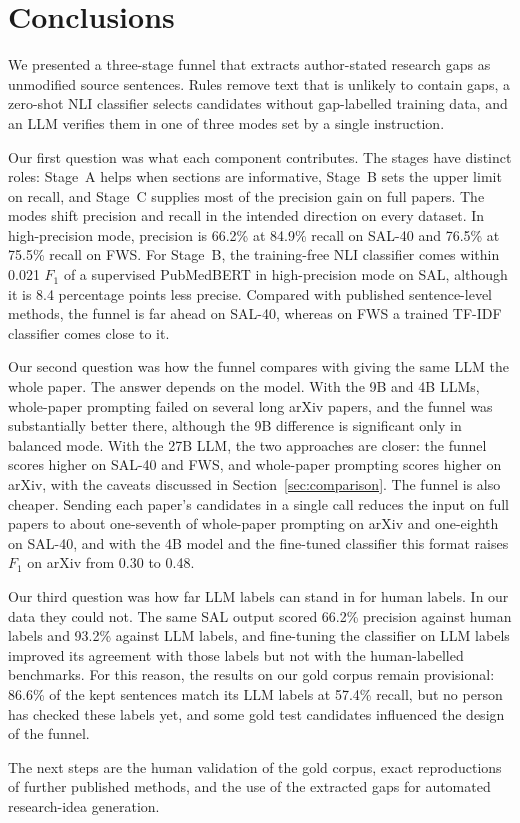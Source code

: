 \section{Conclusions}
\label{sec:conclusions}

We presented a three-stage funnel that extracts author-stated research gaps as unmodified source sentences. Rules remove text that is unlikely to contain gaps, a zero-shot NLI classifier selects candidates without gap-labelled training data, and an LLM verifies them in one of three modes set by a single instruction.

Our first question was what each component contributes. The stages have distinct roles: Stage~A helps when sections are informative, Stage~B sets the upper limit on recall, and Stage~C supplies most of the precision gain on full papers. The modes shift precision and recall in the intended direction on every dataset. In high-precision mode, precision is 66.2\% at 84.9\% recall on SAL-40 and 76.5\% at 75.5\% recall on FWS. For Stage~B, the training-free NLI classifier comes within 0.021 $F_1$ of a supervised PubMedBERT in high-precision mode on SAL, although it is 8.4 percentage points less precise. Compared with published sentence-level methods, the funnel is far ahead on SAL-40, whereas on FWS a trained TF-IDF classifier comes close to it.

Our second question was how the funnel compares with giving the same LLM the whole paper. The answer depends on the model. With the 9B and 4B LLMs, whole-paper prompting failed on several long arXiv papers, and the funnel was substantially better there, although the 9B difference is significant only in balanced mode. With the 27B LLM, the two approaches are closer: the funnel scores higher on SAL-40 and FWS, and whole-paper prompting scores higher on arXiv, with the caveats discussed in Section~\ref{sec:comparison}. The funnel is also cheaper. Sending each paper's candidates in a single call reduces the input on full papers to about one-seventh of whole-paper prompting on arXiv and one-eighth on SAL-40, and with the 4B model and the fine-tuned classifier this format raises $F_1$ on arXiv from 0.30 to 0.48.

Our third question was how far LLM labels can stand in for human labels. In our data they could not. The same SAL output scored 66.2\% precision against human labels and 93.2\% against LLM labels, and fine-tuning the classifier on LLM labels improved its agreement with those labels but not with the human-labelled benchmarks. For this reason, the results on our gold corpus remain provisional: 86.6\% of the kept sentences match its LLM labels at 57.4\% recall, but no person has checked these labels yet, and some gold test candidates influenced the design of the funnel.

The next steps are the human validation of the gold corpus, exact reproductions of further published methods, and the use of the extracted gaps for automated research-idea generation.
